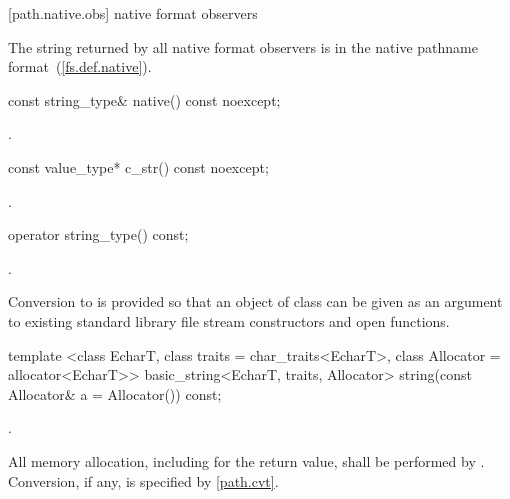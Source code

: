[path.native.obs]{ native format observers}

\pnum
The string returned by all native format observers is in the native pathname format~(\ref{fs.def.native}).

%
\begin{itemdecl}
const string_type& native() const noexcept;
\end{itemdecl}

\begin{itemdescr}
\pnum
\returns {}.
\end{itemdescr}

%
\begin{itemdecl}
const value_type* c_str() const noexcept;
\end{itemdecl}

\begin{itemdescr}
\pnum
\returns {}.
\end{itemdescr}

%
\begin{itemdecl}
operator string_type() const;
\end{itemdecl}

\begin{itemdescr}
\pnum
\returns {}.

\pnum
\begin{note} Conversion to  is provided so that an
  object of class  can be given as an argument to existing
  standard library file stream constructors and open functions. \end{note}
\end{itemdescr}

%
\begin{itemdecl}
template <class EcharT, class traits = char_traits<EcharT>,
          class Allocator = allocator<EcharT>>
  basic_string<EcharT, traits, Allocator>
    string(const Allocator& a = Allocator()) const;
\end{itemdecl}

\begin{itemdescr}
\pnum
\returns {}.

\pnum
\remarks All memory allocation, including for the return value, shall
be performed by . Conversion, if any, is specified by
\ref{path.cvt}.
\end{itemdescr}

